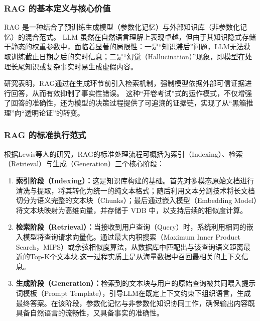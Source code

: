 \documentclass[UTF8,a4paper,zihao=-4]{ctexart}
\begin{document}
\subsubsection{RAG 的基本定义与核心价值}
RAG 是一种结合了预训练生成模型（参数化记忆）与外部知识库（非参数化记忆）的混合范式\cite{gao_retrieval-augmented_2024,lewis_retrieval-augmented_2021}。
LLM 虽然在自然语言理解上表现卓越，但由于其知识隐式存储于静态的权重参数中，面临着显著的局限性：一是“知识滞后”问题，LLM无法获取训练截止日期之后的实时信息；二是“幻觉（Hallucination）”现象，即模型在处理长尾知识或复杂事实时易生成虚假内容\cite{gao_retrieval-augmented_2024,lewis_retrieval-augmented_2021}。

研究表明，RAG通过在生成环节前引入检索机制，强制模型依据外部可信证据进行回答，从而有效抑制了事实性错误\cite{gao_retrieval-augmented_2024,lewis_retrieval-augmented_2021}。
这种“开卷考试”式的运作模式，不仅增强了回答的准确性，还为模型的决策过程提供了可追溯的证据链，实现了从“黑箱推理”向“透明论证”的转变\cite{gao_retrieval-augmented_2024,lewis_retrieval-augmented_2021}。

\subsubsection{RAG 的标准执行范式}
根据Lewis等人的研究，RAG的标准处理流程可概括为索引（Indexing）、检索（Retrieval）与生成（Generation）三个核心阶段：

\begin{enumerate}
    \item  \textbf{索引阶段（Indexing）：}这是知识库构建的基础。首先对多模态原始文档进行清洗与提取，将其转化为统一的纯文本格式；随后利用文本分割技术将长文档切分为语义完整的文本块（Chunks）；最后通过嵌入模型（Embedding Model）将文本块映射为高维向量，并存储于 VDB 中，以支持后续的相似度计算\cite{gao_retrieval-augmented_2024,ma_comprehensive_2025}。
    \item  \textbf{检索阶段（Retrieval）：}当接收到用户查询（Query）时，系统利用相同的嵌入模型将查询请求向量化。通过最大内积搜索（Maximum Inner Product Search，MIPS）或余弦相似度算法，从数据库中匹配出与该查询语义距离最近的Top-K个文本块.\cite{lewis_retrieval-augmented_2021}这一过程实质上是从海量数据中召回最相关的上下文信息。
    \item  \textbf{生成阶段（Generation）：}检索到的文本块与用户的原始查询被共同喂入提示词模板（Prompt Template），引导LLM在既定上下文约束下组织语言，生成最终答案\cite{gao_retrieval-augmented_2024,lewis_retrieval-augmented_2021}。在该阶段，参数化记忆与非参数化知识协同工作，确保输出内容既具备自然语言的流畅性，又具备事实的准确性。
\end{enumerate}
\end{document}
